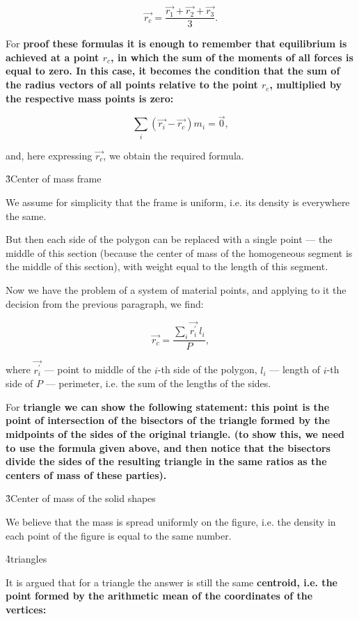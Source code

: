 $$ \vec{r_c} = \frac{ \vec{r_1} + \vec{r_2} + \vec{r_3} }{ 3 }. $$

For \bf{proof} these formulas it is enough to remember that equilibrium is achieved at a point $r_c$, in which the sum of the moments of all forces is equal to zero. In this case, it becomes the condition that the sum of the radius vectors of all points relative to the point $r_c$, multiplied by the respective mass points is zero:

$$ \sum\limits_i \left( \vec{r_i} - \vec{r_c} \right) m_i = \vec{0}, $$

and, here expressing $\vec{r_c}$, we obtain the required formula.


\h3{Center of mass frame}

We assume for simplicity that the frame is uniform, i.e. its density is everywhere the same.

But then each side of the polygon can be replaced with a single point --- the middle of this section (because the center of mass of the homogeneous segment is the middle of this section), with weight equal to the length of this segment.

Now we have the problem of a system of material points, and applying to it the decision from the previous paragraph, we find:

$$ \vec{r_c} = \frac{ \sum\limits_i \vec{r_i^\prime} ~ l_i }{ P }, $$

where $\vec{r_i^\prime}$ --- point to middle of the $i$-th side of the polygon, $l_i$ --- length of $i$-th side of $P$ --- perimeter, i.e. the sum of the lengths of the sides.

For \bf{triangle} we can show the following statement: this point is \bf{the point of intersection of the bisectors} of the triangle formed by the midpoints of the sides of the original triangle. (to show this, we need to use the formula given above, and then notice that the bisectors divide the sides of the resulting triangle in the same ratios as the centers of mass of these parties).


\h3{Center of mass of the solid shapes}

We believe that the mass is spread uniformly on the figure, i.e. the density in each point of the figure is equal to the same number.

\h4{triangles}

It is argued that for a triangle the answer is still the same \bf{centroid}, i.e. the point formed by the arithmetic mean of the coordinates of the vertices:

